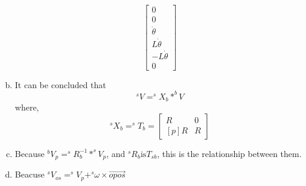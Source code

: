 \begin{enumerate}[(a)]
\[\begin{bmatrix}
    0 \\ 0 \\ \dot{\theta} \\ L\dot{\theta} \\ -L\dot{\theta} \\ 0
    \end{bmatrix}\]
    \item 
    It can be concluded that \[^sV= ^sX_b * ^bV \]
    where, 
    \[^sX_b = ^sT_b = \begin{bmatrix}
        R & 0 \\ [p]R & R
    \end{bmatrix} \]
    \item 
    Because \(^bV_p = ^sR_b^{-1} * ^sV_p\), and \(^sR_b\text{is}T_{sb}\), this is the relationship between them.
    \item 
    Beacuse \(^sV_{os} = ^sV_p + ^s\omega \times \overrightarrow{opos}\)
\end{enumerate}